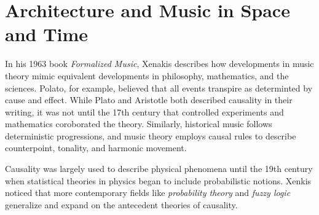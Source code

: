 \documentclass{tufte-book}
\begin{document}
\section{Architecture and Music in Space and Time}
\label{sec:introduction-conclusion}

In his 1963 book \textit{Formalized Music}, Xenakis describes how
developments in music theory mimic equivalent developments in
philosophy, mathematics, and the sciences. Polato, for example,
believed that all events transpire as determinted by cause and
effect. While Plato and Aristotle both described causality in their
writing, it was not until the 17th century that controlled experiments
and mathematics coroborated the theory.  Similarly, historical music
follows deterministic progressions, and music theory employs causal
rules to describe counterpoint, tonality, and harmonic movement.

Causality was largely used to describe physical phenomena until the
19th century when statistical theories in physics began to include
probabilistic notions. Xenkis
noticed that more contemporary fields like \emph{probability theory}
and \emph{fuzzy logic} generalize and expand on the antecedent
theories of causality.
\end{document}
